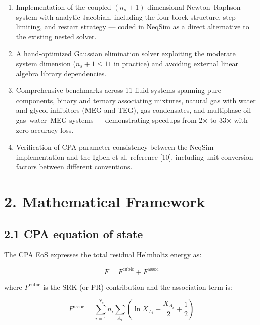 \documentclass[review,3p]{elsarticle}
\begin{document}
\begin{enumerate}
  \item Implementation of the coupled $(n_s + 1)$-dimensional Newton–Raphson system with analytic Jacobian, including the four-block structure, step limiting, and restart strategy — coded in NeqSim as a direct alternative to the existing nested solver.

  \item A hand-optimized Gaussian elimination solver exploiting the moderate system dimension ($n_s + 1 \leq 11$ in practice) and avoiding external linear algebra library dependencies.

  \item Comprehensive benchmarks across 11 fluid systems spanning pure components, binary and ternary associating mixtures, natural gas with water and glycol inhibitors (MEG and TEG), gas condensates, and multiphase oil–gas–water–MEG systems — demonstrating speedups from 2× to 33× with zero accuracy loss.

  \item Verification of CPA parameter consistency between the NeqSim implementation and the Igben et al. reference [10], including unit conversion factors between different conventions.
\end{enumerate}


\section{2. Mathematical Framework}



\subsection{2.1 CPA equation of state}

The CPA EoS expresses the total residual Helmholtz energy as:

\begin{equation}

F = F^{\text{cubic}} + F^{\text{assoc}}

\end{equation}

where $F^{\text{cubic}}$ is the SRK (or PR) contribution and the association term is:

\begin{equation}

F^{\text{assoc}} = \sum_{i=1}^{N_c} n_i \sum_{A_i} \left( \ln X_{A_i} - \frac{X_{A_i}}{2} + \frac{1}{2} \right)

\end{equation}
\end{document}

